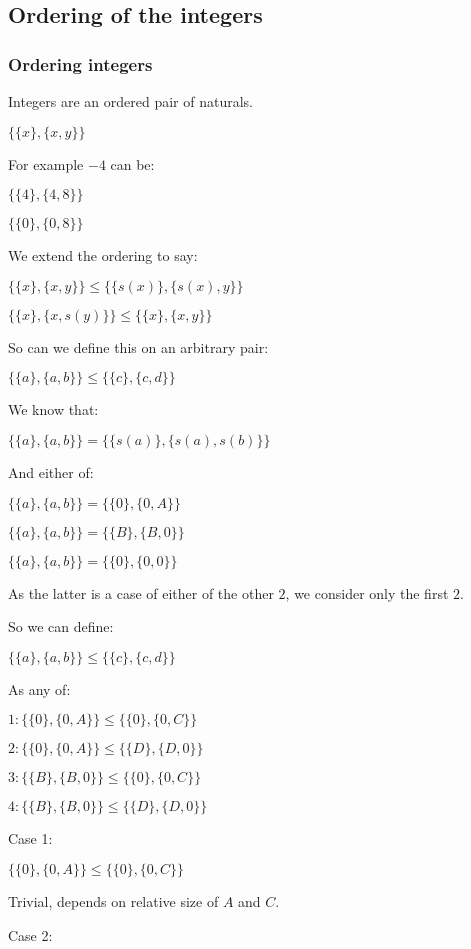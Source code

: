 \subsection{Ordering of the integers}

\subsubsection{Ordering integers}

Integers are an ordered pair of naturals.

\(\{\{x\},\{x,y\}\}\)

For example \(-4\) can be:

\(\{\{4\},\{4,8\}\}\)

\(\{\{0\},\{0,8\}\}\)

We extend the ordering to say:

\(\{\{x\},\{x,y\}\}\le \{\{s(x)\},\{s(x),y\}\}\)

\(\{\{x\},\{x,s(y)\}\}\le \{\{x\},\{x,y\}\}\)

So can we define this on an arbitrary pair:

\(\{\{a\},\{a,b\}\}\le \{\{c\},\{c,d\}\}\)

We know that:

\(\{\{a\},\{a,b\}\}=\{\{s(a)\},\{s(a),s(b)\}\}\)

And either of:

\(\{\{a\},\{a,b\}\}=\{\{0\},\{0,A\}\}\)

\(\{\{a\},\{a,b\}\}=\{\{B\},\{B,0\}\}\)

\(\{\{a\},\{a,b\}\}=\{\{0\},\{0,0\}\}\)

As the latter is a case of either of the other \(2\), we consider only the first \(2\).

So we can define:

\(\{\{a\},\{a,b\}\}\le \{\{c\},\{c,d\}\}\)

As any of:

\(1: \{\{0\},\{0,A\}\}\le \{\{0\},\{0,C\}\}\)

\(2: \{\{0\},\{0,A\}\}\le \{\{D\},\{D,0\}\}\)

\(3: \{\{B\},\{B,0\}\}\le \{\{0\},\{0,C\}\}\)

\(4: \{\{B\},\{B,0\}\}\le \{\{D\},\{D,0\}\}\)

Case 1:

\(\{\{0\},\{0,A\}\}\le \{\{0\},\{0,C\}\}\)

Trivial, depends on relative size of \(A\) and \(C\).

Case 2:

